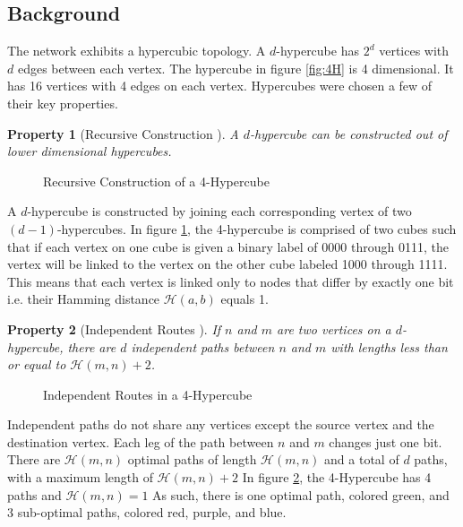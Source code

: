 \documentclass[apa6]{IEEEtran}
\theoremstyle{plain}
\newtheorem{property}{Property}
\begin{document}
	\subsection{Background}
		The network exhibits a hypercubic topology. 
		A $d$-hypercube has $2^d$ vertices with $d$ edges between each vertex. 
		The hypercube in figure \ref{fig:4H} is 4 dimensional. 
		It has 16 vertices with 4 edges on each vertex.
		Hypercubes were chosen a few of their key properties.

		
		\begin{property}[Recursive Construction \cite{saad_topological_1988}]
			\label{recursiveconstruction} 
			A $d$-hypercube can be constructed out of lower dimensional hypercubes.
		\end{property}
		 
	    \begin{figure}[H]
		    \hspace*{-0.05\linewidth}
		    \centering
			
		    \captionsetup{}
		    \caption{Recursive Construction of a 4-Hypercube}
		    \label{fig:4HRC}
	    \end{figure}
		A $d$-hypercube is constructed by joining each corresponding vertex of two $(d-1)$-hypercubes. 
		In figure \ref{fig:4HRC},
		the 4-hypercube is comprised of two cubes such that if each vertex on one cube is given a binary label of 0000 through 0111,
		the vertex will be linked to the vertex on the other cube labeled 1000 through 1111.
		This means that each vertex is linked only to nodes that differ by exactly one bit i.e. their Hamming distance $\mathcal{H}(a,b)$ equals 1.
		
		\begin{property}[Independent Routes \cite{saad_topological_1988}]
			\label{independentroutes}
			If $n$ and $m$ are two vertices on a $d$-hypercube, 
			there are $d$ independent paths between $n$ and $m$ with lengths less than or equal to $\mathcal{H}(m,n)+2$.
		\end{property}
	    \begin{figure}[H]
		    \hspace*{-0.05\linewidth}
		    \centering
			
		    \captionsetup{}
		    \caption{Independent Routes in a 4-Hypercube}
		    \label{fig:4HIR}
	    \end{figure}
		Independent paths do not share any vertices except the source vertex and the destination vertex.
		Each leg of the path between $n$ and $m$ changes just one bit.
		There are $\mathcal{H}(m,n)$ optimal paths of length $\mathcal{H}(m,n)$ and a total of $d$ paths,
		with a maximum length of $\mathcal{H}(m,n)+2$
		In figure \ref{fig:4HIR}, the 4-Hypercube has 4 paths and $\mathcal{H}(m,n)=1$
		As such, there is one optimal path, colored green, and 3 sub-optimal paths, colored red, purple, and blue.
\end{document}
